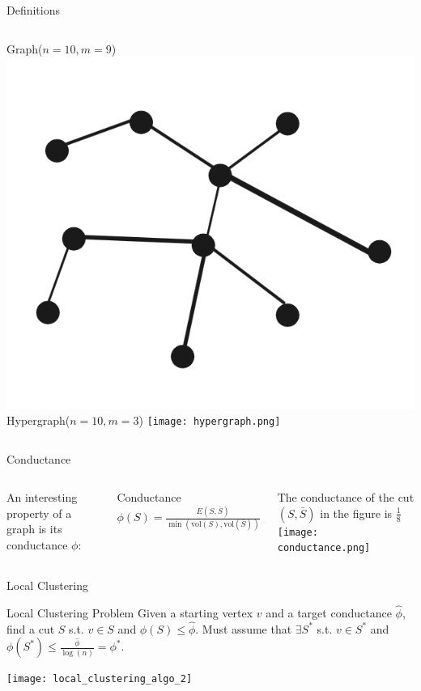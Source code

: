 \documentclass[../main.tex]{subfiles}
\begin{document}
	
	\begin{frame}{Definitions}
		\begin{columns}
				Graph($n=10, m=9$)
				\includegraphics[width=1.0\textwidth]{Figures/graph}
				Hypergraph($n=10, m=3$)
				\texttt{[image: hypergraph.png]}
		\end{columns}
	\end{frame}

    \begin{frame}{Conductance} 
    	\begin{columns}
    		\column{0.5\textwidth}
				An interesting property of a graph is its conductance $\phi$:
	
	           	\begin{block}{Conductance}
	           		$\phi(S) = \frac{E(S, \bar{S})}{\min(\text{vol}(S), \text{vol}(\bar{S}))}$
	           	\end{block}
           		
           		The conductance of the cut $(S, \bar{S})$ in the figure is $\frac{1}{8}$
	            \texttt{[image: conductance.png]}
        \end{columns}
    \end{frame}

	\begin{frame}{Local Clustering}
		\begin{block}{Local Clustering Problem}
			Given a starting vertex $v$ and a target conductance $\hat{\phi}$, find a cut $S$ s.t. $v\in S$ and $\phi(S) \leq \hat{\phi}$. Must assume that $\exists S^*$ s.t. $v\in S^*$ and $\phi(S^*) \leq \frac{\hat{\phi}}{\log(n)} = \phi^*$.
		\end{block}
		\texttt{[image: local\_clustering\_algo\_2]}
	\end{frame}
    
\end{document}
